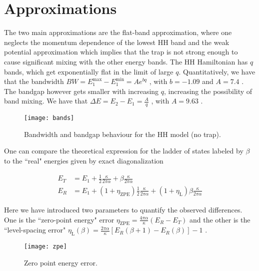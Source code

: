 \documentclass[twocolumn, 10pt, aps, superscriptaddress, floatfix, showpacs, prb, citeautoscript]{revtex4-1}
\begin{document}
\appendix

\section{Approximations}\label{app:approximations}
The two main approximations are the flat-band approximation, where one
neglects the momentum dependence of the lowest HH band and the weak
potential approximation which implies that the trap is not strong
enough to cause significant mixing with the other energy bands.  The
HH Hamiltonian has $q$ bands, which get exponentially flat in the
limit of large $q$. Quantitatively, we have that the bandwidth $BW =
E_1^{\text{max}} - E_1^{\text{min}} = A e^{b q}$ , with $b = -1.09$
and $A = 7.4$ . The bandgap however gets smaller with increasing $q$,
increasing the possibility of band mixing. We have that $\Delta E =
E_2 - E_1 = \frac{A}{q}$ , with $A=9.63$ .


\begin{figure}[htb]\centering
  \texttt{[image: bands]}
  \caption{Bandwidth and bandgap behaviour for the HH model (no trap).}
  \label{fig:energy_bands}
\end{figure}


One can compare the theoretical expression for the ladder of states labeled by $\beta$ 
to the ``real" energies given by exact diagonalization

\begin{subequations}
  \begin{align}
    E_T &= E_1 + \frac{1}{2}\frac{\kappa}{2\pi\alpha} + \beta \frac{\kappa}{2\pi\alpha}\\
    E_R &= E_1 +
          (1+\eta_{\text{ZPE}})\frac{1}{2}\frac{\kappa}{2\pi\alpha} +
          (1+\eta_{\text{L}})\beta \frac{\kappa}{2\pi\alpha}
  \end{align}   
\end{subequations}
  


Here we have introduced two parameters to quantify the observed
differences. One is the ``zero-point energy" error $\eta_{\text{ZPE}} =
\frac{4\pi\alpha}{\kappa} (E_R - E_T)$ and the other is the
``level-spacing error" $\eta_{\text{L}} (\beta) = \frac{2\pi
\alpha}{\kappa} [E_R(\beta+1) - E_R(\beta)] -1$ .

\begin{figure}[htb]\centering
  \texttt{[image: zpe]}
  \caption{Zero point energy error.}
  \label{fig:zpe}
\end{figure}
\end{document}
